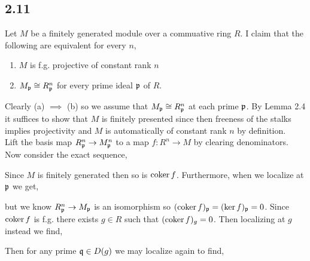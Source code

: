 \documentclass[12pt]{article}
\begin{document}
\subsection{2.11}

Let $M$ be a finitely generated module over a commuative ring $R$. I claim that the following are equivalent for every $n$,
\begin{enumerate}
\item $M$ is f.g. projective of constant rank $n$
\item $M_{\mathfrak{p}} \cong R^n_{\mathfrak{p}}$ for every prime ideal $\mathfrak{p}$ of $R$.
\end{enumerate}
Clearly (a) $\implies$ (b) so we assume that $M_{\mathfrak{p}} \cong R^n_{\mathfrak{p}}$ at each prime $\mathfrak{p}$. By Lemma 2.4 it suffices to show that $M$ is finitely presented since then freeness of the stalks implies projectivity and $M$ is automatically of constant rank $n$ by definition. 
\bigskip\\
Lift the basis map $R_{\mathfrak{p}}^n \to M_{\mathfrak{p}}^n$ to a map $f : R^n \to M$ by clearing denominators. Now consider the exact sequence,
\begin{center}
\end{center}
Since $M$ is finitely generated then so is $\operatorname{\mathrm{coker}}{f}$. Furthermore, when we localize at $\mathfrak{p}$ we get,
\begin{center}
\end{center}
but we know $R^n_{\mathfrak{p}} \to M_{\mathfrak{p}}$ is an isomorphism so $(\operatorname{\mathrm{coker}}{f})_{\mathfrak{p}} = (\ker{f})_{\mathfrak{p}} = 0$. Since $\operatorname{\mathrm{coker}}{f}$ is f.g. there exists $g \in R$ such that $(\operatorname{\mathrm{coker}}{f})_g = 0$. Then localizing at $g$ instead we find,
\begin{center}
\end{center}
Then for any prime $\mathfrak{q} \in D(g)$ we may localize again to find,
\begin{center}
\end{center}
\end{document}
